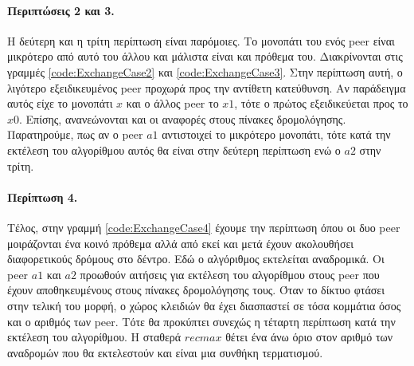 \paragraph{Περιπτώσεις 2 και 3.} Η δεύτερη και η τρίτη περίπτωση είναι 
παρόμοιες. Το μονοπάτι του ενός peer είναι μικρότερο από αυτό του άλλου 
και μάλιστα είναι και πρόθεμα του. Διακρίνονται στις γραμμές 
\ref{code:ExchangeCase2} και \ref{code:ExchangeCase3}. 
Στην περίπτωση αυτή, ο λιγότερο 
εξειδικευμένος peer προχωρά προς την αντίθετη κατεύθυνση. Αν παράδειγμα 
αυτός είχε το μονοπάτι $x$ και ο άλλος peer το $x1$, τότε ο πρώτος 
εξειδικεύεται προς το $x0$. Επίσης, ανανεώνονται και οι αναφορές στους 
πίνακες δρομολόγησης. Παρατηρούμε, πως αν ο peer $a1$ αντιστοιχεί το 
μικρότερο μονοπάτι, τότε κατά την εκτέλεση του αλγορίθμου αυτός θα είναι 
στην δεύτερη περίπτωση ενώ ο $a2$ στην τρίτη.

\paragraph{Περίπτωση 4.} Τέλος, στην γραμμή \ref{code:ExchangeCase4} 
έχουμε την περίπτωση όπου οι δυο peer 
μοιράζονται ένα κοινό πρόθεμα αλλά από εκεί και μετά έχουν ακολουθήσει 
διαφορετικούς δρόμους στο δέντρο. Εδώ ο αλγόριθμος εκτελείται αναδρομικά. 
Οι peer $a1$ και $a2$ προωθούν αιτήσεις για εκτέλεση του αλγορίθμου στους 
peer που έχουν αποθηκευμένους στους πίνακες δρομολόγησης τους. Όταν 
το δίκτυο φτάσει στην τελική του μορφή, ο χώρος κλειδιών θα έχει διασπαστεί 
σε τόσα κομμάτια όσος και ο αριθμός των peer. Τότε θα προκύπτει συνεχώς η 
τέταρτη περίπτωση κατά την εκτέλεση του αλγορίθμου. Η σταθερά $recmax$ 
θέτει ένα άνω όριο στον αριθμό των αναδρομών που θα εκτελεστούν και είναι 
μια συνθήκη τερματισμού.

